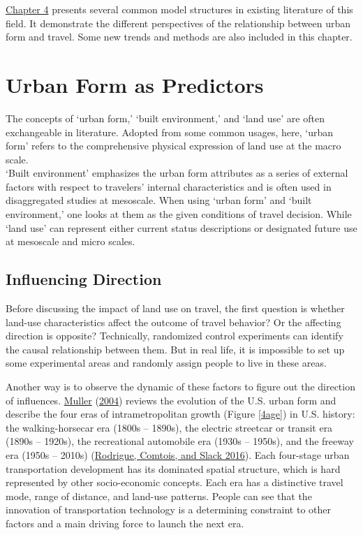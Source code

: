 \documentclass[
  11pt,
  openany]{memoir}
\begin{document}
\protect\hyperlink{struc}{Chapter 4} presents several common model structures in existing literature of this field. It demonstrate the different perspectives of the relationship between urban form and travel. Some new trends and methods are also included in this chapter.

\hypertarget{form}{%
\chapter{Urban Form as Predictors}\label{form}}

The concepts of `urban form,' `built environment,' and `land use' are often exchangeable in literature. Adopted from some common usages, here, `urban form' refers to the comprehensive physical expression of land use at the macro scale.\\
`Built environment' emphasizes the urban form attributes as a series of external factors with respect to travelers' internal characteristics and is often used in disaggregated studies at mesoscale. When using `urban form' and `built environment,' one looks at them as the given conditions of travel decision. While `land use' can represent either current status descriptions or designated future use at mesoscale and micro scales.

\hypertarget{influencing-direction}{%
\section{Influencing Direction}\label{influencing-direction}}

Before discussing the impact of land use on travel, the first question is whether land-use characteristics affect the outcome of travel behavior? Or the affecting direction is opposite? Technically, randomized control experiments can identify the causal relationship between them. But in real life, it is impossible to set up some experimental areas and randomly assign people to live in these areas.

Another way is to observe the dynamic of these factors to figure out the direction of influences. \protect\hyperlink{ref-mullerTransportationUrbanForm2004}{Muller} (\protect\hyperlink{ref-mullerTransportationUrbanForm2004}{2004}) reviews the evolution of the U.S. urban form and describe the four eras of intrametropolitan growth (Figure \ref{4age}) in U.S. history: the walking-horsecar era (1800s -- 1890s), the electric streetcar or transit era (1890s -- 1920s), the recreational automobile era (1930s -- 1950s), and the freeway era (1950s -- 2010s) (\protect\hyperlink{ref-rodrigueGeographyTransportSystems2016}{Rodrigue, Comtois, and Slack 2016}). Each four-stage urban transportation development has its dominated spatial structure, which is hard represented by other socio-economic concepts. Each era has a distinctive travel mode, range of distance, and land-use patterns. People can see that the innovation of transportation technology is a determining constraint to other factors and a main driving force to launch the next era.
\end{document}
